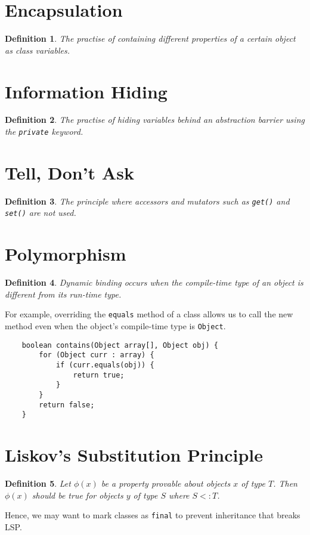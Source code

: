 \documentclass[10pt,landscape,a4paper]{article}
\newtheorem{definition}{Definition}[section]
\begin{document}
\footnotesize
\begin{multicols*}{4}

\section{Encapsulation}
\begin{definition}
    The practise of containing different properties of a certain object as class variables.
\end{definition}

\section{Information Hiding}
\begin{definition}
    The practise of hiding variables behind an abstraction barrier using the \texttt{private} keyword.
\end{definition}

\section{Tell, Don't Ask}
\begin{definition}
    The principle where accessors and mutators such as \texttt{get()} and \texttt{set()} are not used.
\end{definition}

\section{Polymorphism}
\begin{definition}
    Dynamic binding occurs when the compile-time type of an object is different from its run-time type.
\end{definition}
For example, overriding the \texttt{equals} method of a class allows us to call the new method even when the object's compile-time type is \texttt{Object}.
\begin{lstlisting}
    boolean contains(Object array[], Object obj) {
        for (Object curr : array) {
            if (curr.equals(obj)) {
                return true;
            }
        }
        return false;
    }
\end{lstlisting}

\section{Liskov's Substitution Principle}
\begin{definition}
    Let $\phi(x)$ be a property provable about objects $x$ of type $T$. Then $\phi(x)$ should be true for objects $y$ of type $S$ where $S<:T$.
\end{definition}
Hence, we may want to mark classes as \texttt{final} to prevent inheritance that breaks LSP.


\end{multicols*}
\end{document}
